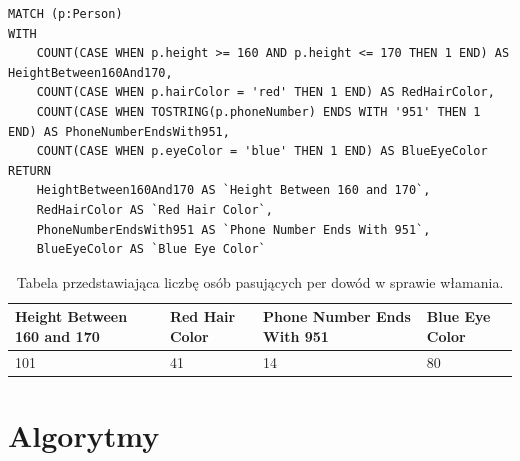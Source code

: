 \documentclass[a4paper,12pt]{article}
\begin{document}
\begin{center}
\begin{minipage}{0.8\linewidth}
\begin{lstlisting}[language=Cypher, basicstyle=\small, breaklines=true]
MATCH (p:Person)
WITH
    COUNT(CASE WHEN p.height >= 160 AND p.height <= 170 THEN 1 END) AS HeightBetween160And170,
    COUNT(CASE WHEN p.hairColor = 'red' THEN 1 END) AS RedHairColor,
    COUNT(CASE WHEN TOSTRING(p.phoneNumber) ENDS WITH '951' THEN 1 END) AS PhoneNumberEndsWith951,
    COUNT(CASE WHEN p.eyeColor = 'blue' THEN 1 END) AS BlueEyeColor
RETURN 
    HeightBetween160And170 AS `Height Between 160 and 170`, 
    RedHairColor AS `Red Hair Color`, 
    PhoneNumberEndsWith951 AS `Phone Number Ends With 951`,
    BlueEyeColor AS `Blue Eye Color`
\end{lstlisting}
\end{minipage}
\end{center}

\begin{table}[h!]
\centering
\begin{tabular}{|p{4cm}|p{4cm}|p{4cm}|p{4cm}|}
\hline
\textbf{Height Between 160 and 170} & \textbf{Red Hair Color} & \textbf{Phone Number Ends With 951} & \textbf{Blue Eye Color} \\
\hline
101 & 41 & 14 & 80 \\
\hline
\end{tabular}
\caption{Tabela przedstawiająca liczbę osób pasujących per dowód w sprawie włamania.}
\label{tab:criteria_counts}
\end{table}

\newpage

\section{Algorytmy}
\end{document}

